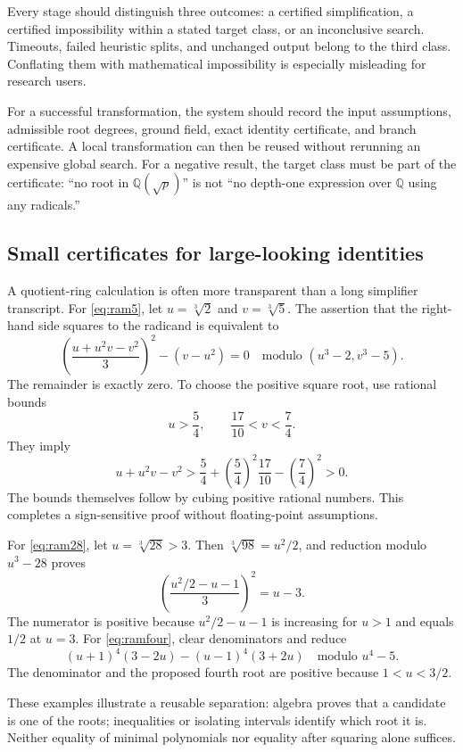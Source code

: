 \documentclass[11pt,a4paper]{article}
\newcommand{\Q}{\mathbb{Q}}
\newcommand{\cbrt}[1]{\sqrt[3]{#1}}
\theoremstyle{definition}
\theoremstyle{remark}
\numberwithin{equation}{section}
\begin{document}
Every stage should distinguish three outcomes: a certified simplification, a certified impossibility within a stated target class, or an inconclusive search. Timeouts, failed heuristic splits, and unchanged output belong to the third class. Conflating them with mathematical impossibility is especially misleading for research users.

For a successful transformation, the system should record the input assumptions, admissible root degrees, ground field, exact identity certificate, and branch certificate. A local transformation can then be reused without rerunning an expensive global search. For a negative result, the target class must be part of the certificate: ``no root in $\Q(\sqrt p)$'' is not ``no depth-one expression over $\Q$ using any radicals.''

\subsection{Small certificates for large-looking identities}

A quotient-ring calculation is often more transparent than a long simplifier transcript. For \eqref{eq:ram5}, let $u=\cbrt2$ and $v=\cbrt5$. The assertion that the right-hand side squares to the radicand is equivalent to
\[
 \left(\frac{u+u^2v-v^2}{3}\right)^2-(v-u^2)=0
 \quad\text{modulo }(u^3-2,v^3-5).
\]
The remainder is exactly zero. To choose the positive square root, use rational bounds
\[
 u>\frac54,\qquad \frac{17}{10}<v<\frac74.
\]
They imply
\[
 u+u^2v-v^2>
 \frac54+\left(\frac54\right)^2\frac{17}{10}
 -\left(\frac74\right)^2>0.
\]
The bounds themselves follow by cubing positive rational numbers. This completes a sign-sensitive proof without floating-point assumptions.

For \eqref{eq:ram28}, let $u=\cbrt{28}>3$. Then $\cbrt{98}=u^2/2$, and reduction modulo $u^3-28$ proves
\[
 \left(\frac{u^2/2-u-1}{3}\right)^2=u-3.
\]
The numerator is positive because $u^2/2-u-1$ is increasing for $u>1$ and equals $1/2$ at $u=3$. For \eqref{eq:ramfour}, clear denominators and reduce
\[
 (u+1)^4(3-2u)-(u-1)^4(3+2u)
 \quad\text{modulo }u^4-5.
\]
The denominator and the proposed fourth root are positive because $1<u<3/2$.

These examples illustrate a reusable separation: algebra proves that a candidate is one of the roots; inequalities or isolating intervals identify which root it is. Neither equality of minimal polynomials nor equality after squaring alone suffices.
\end{document}
